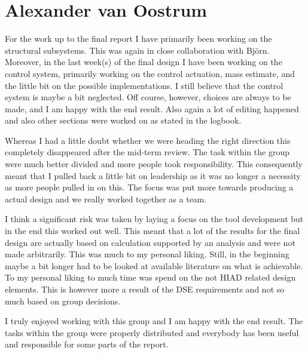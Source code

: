 \section{Alexander van Oostrum}

For the work up to the final report I have primarily been working on the structural subsystems. This was again in close collaboration with Bj\"{o}rn. Moreover, in the last week(s) of the final design I have been working on the control system, primarily working on the control actuation, mass estimate, and the little bit on the possible implementations. I still believe that the control system is maybe a bit neglected. Off course, however, choices are always to be made, and I am happy with the end result. Also again a lot of editing happened and also other sections were worked on as stated in the logbook.

Whereas I had a little doubt whether we were heading the right direction this completely disappeared after the mid-term review. The task within the group were much better divided and more people took responsibility. This consequently meant that I pulled back a little bit on leadership as it was no longer a necessity as more people pulled in on this. The focus was put more towards producing a actual design and we really worked together as a team. 

I think a significant risk was taken by laying a focus on the tool development but in the end this worked out well. This meant that a lot of the results for the final design are actually based on calculation supported by an analysis and were not made arbitrarily. This was much to my personal liking. Still, in the beginning maybe a bit longer had to be looked at available literature on what is achievable. To my personal liking to much time was spend on the not HIAD related design elements. This is however more a result of the DSE requirements and not so much based on group decisions.

I truly enjoyed working with this group and I am happy with the end result. The tasks within the group were properly distributed and everybody has been useful and responsible for some parts of the report.
